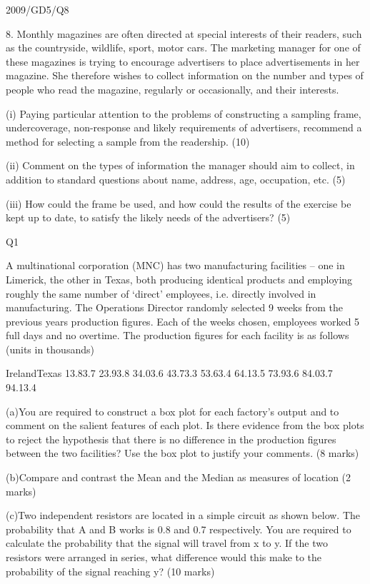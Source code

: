 	2009/GD5/Q8
			
			8. Monthly magazines are often directed at special interests of their readers, such as the countryside, wildlife, sport, motor cars. The marketing manager for one of these magazines is trying to encourage advertisers to place advertisements in her magazine. She therefore wishes to collect information on the number and types of people who read the magazine, regularly or occasionally, and their interests.
			
			(i) Paying particular attention to the problems of constructing a sampling frame, undercoverage, non-response and likely requirements of advertisers, recommend a method
			for selecting a sample from the readership. (10)
			
			(ii) Comment on the types of information the manager should aim to collect, in addition to standard questions about name, address, age, occupation, etc. (5)
			
			(iii) How could the frame be used, and how could the results of the exercise be kept up to date, to satisfy the likely needs of the advertisers? (5)
			
	
			
		
		
			Q1
			
			A multinational corporation (MNC) has two manufacturing facilities – one in Limerick, the other in Texas, both producing identical products and employing roughly the same number of ‘direct’ employees, i.e. directly involved in manufacturing.  The Operations Director randomly selected 9 weeks from the previous years production figures.  Each of the weeks chosen, employees worked 5 full days and no overtime.  The production figures for each facility is as follows (units in thousands)
			
			
			IrelandTexas
			13.83.7
			23.93.8
			34.03.6
			43.73.3
			53.63.4
			64.13.5
			73.93.6
			84.03.7
			94.13.4
			
			
			(a)You are required to construct a box plot for each factory’s output and to comment on the salient features of each plot.  Is there evidence from the box plots to reject the hypothesis that there is no difference in the production figures between the two facilities?  Use the box plot to justify your comments. (8 marks)
			
			(b)Compare and contrast the Mean and the Median as measures of location
			(2 marks)
			
			(c)Two independent resistors are located in a simple circuit as shown below.  The probability that A and B works is 0.8 and 0.7 respectively.  You are required to calculate the probability that the signal will travel from x to y.  If the two resistors were arranged in series, what difference would this make to the probability of the signal reaching y?
			(10 marks)
			
